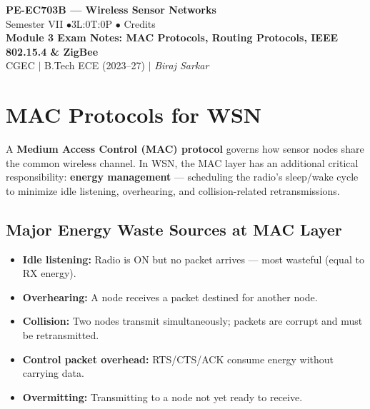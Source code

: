 \documentclass[12pt,a4paper]{article}
\begin{document}

\begin{center}
  {\LARGE\bfseries\color{myred} PE-EC703B --- Wireless Sensor Networks}\\[5pt]
  {\normalsize\color{mydark} Semester VII \quad$\bullet$\quad 3L:0T:0P \quad$\bullet$ Credits}\\[3pt]
  {\normalsize\color{myteal}\textbf{Module 3 Exam Notes: MAC Protocols, Routing Protocols, IEEE 802.15.4 \& ZigBee}}\\[3pt]
  {\small\color{mydark} CGEC \;$|$\; B.Tech ECE (2023--27) \;$|$\; \textit{Biraj Sarkar}}
\end{center}
\vspace{2pt}
\noindent{\color{myred}\rule{\linewidth}{1.5pt}}
\vspace{2pt}

\hypersetup{linkcolor=mydark}
\tableofcontents
\hypersetup{linkcolor=myteal}
\newpage

\section{MAC Protocols for WSN}

\begin{tcolorbox}[defbox, title={\textbf{MAC Protocol --- Definition}}]
A \textbf{Medium Access Control (MAC) protocol} governs how sensor nodes share the common wireless channel. In WSN, the MAC layer has an additional critical responsibility: \textbf{energy management} --- scheduling the radio's sleep/wake cycle to minimize idle listening, overhearing, and collision-related retransmissions.
\end{tcolorbox}

\subsection{Major Energy Waste Sources at MAC Layer}
\begin{itemize}[leftmargin=*, itemsep=3pt]
  \item \textbf{Idle listening:} Radio is ON but no packet arrives --- most wasteful (equal to RX energy).
  \item \textbf{Overhearing:} A node receives a packet destined for another node.
  \item \textbf{Collision:} Two nodes transmit simultaneously; packets are corrupt and must be retransmitted.
  \item \textbf{Control packet overhead:} RTS/CTS/ACK consume energy without carrying data.
  \item \textbf{Overmitting:} Transmitting to a node not yet ready to receive.
\end{itemize}
\end{document}

